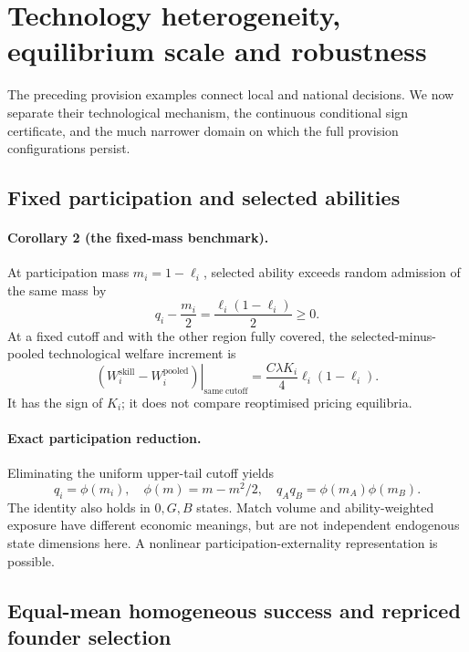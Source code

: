 \section{Technology heterogeneity, equilibrium scale and robustness}\label{sec:numerical}
The preceding provision examples connect local and national decisions. We now separate their technological mechanism, the continuous conditional sign certificate, and the much narrower domain on which the full provision configurations persist.

\subsection{Fixed participation and selected abilities}
\paragraph{Corollary 2 (the fixed-mass benchmark).}
At participation mass $m_i=1-\ell_i$, selected ability exceeds random admission of the same mass by
\begin{equation}
 q_i-\frac{m_i}{2}=\frac{\ell_i(1-\ell_i)}2\geq0.
 \label{eq:C1}
\end{equation}
At a fixed cutoff and with the other region fully covered, the selected-minus-pooled technological welfare increment is
\begin{equation}
 \left.(W_i^{\mathrm{skill}}-W_i^{\mathrm{pooled}})\right|_{\mathrm{same\ cutoff}}
 =\frac{C\lambda K_i}{4}\ell_i(1-\ell_i).
 \label{eq:fixedmass-composition}
\end{equation}
It has the sign of $K_i$; it does not compare reoptimised pricing equilibria.

\paragraph{Exact participation reduction.}
Eliminating the uniform upper-tail cutoff yields
\begin{equation}
 q_i=\phi(m_i),\quad \phi(m)=m-m^2/2,\quad
 q_Aq_B=\phi(m_A)\phi(m_B).
 \label{eq:single-index-reduction}
\end{equation}
The identity also holds in $0,G,B$ states.
Match volume and ability-weighted exposure have different economic meanings, but are not independent endogenous state dimensions here.
A nonlinear participation-externality representation is possible.


\subsection{Equal-mean homogeneous success and repriced founder selection}

